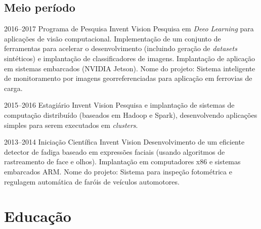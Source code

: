 \documentclass[a4paper]{cv-friggeri-x}
\begin{document}

\subsection{Meio período}

\begin{entrylist}

\entry
    {2016--2017}
    {Programa de Pesquisa}%
    {Invent Vision}
    {Pesquisa em \textit{Deeo Learning} para aplicações de visão computacional. Implementação de um conjunto de ferramentas para acelerar o desenvolvimento (incluindo geração de \textit{datasets} sintéticos) e implantação de classificadores de imagens. Implantação de aplicação em sistemas embarcados (NVIDIA Jetson). Nome do projeto: Sistema inteligente de monitoramento por imagens georreferenciadas para aplicação em ferrovias de carga.}

\entry
    {2015--2016}
    {Estagiário}
    {Invent Vision}
    {Pesquisa e implantação de sistemas de computação distribuído (baseados em Hadoop e Spark), desenvolvendo aplicações simples para serem executados em \textit{clusters}.}

\entry
    {2013--2014}
    {Iniciação Científica}
    {Invent Vision}
    {Desenvolvimento de um eficiente detector de fadiga baseado em expressões faciais (usando algoritmos de rastreamento de face e olhos). Implantação em computadores x86 e sistemas embarcados ARM. Nome do projeto: Sistema para inspeção fotométrica e regulagem automática de faróis de veículos automotores.}



\end{entrylist}


\section{Educação}
\end{document}
